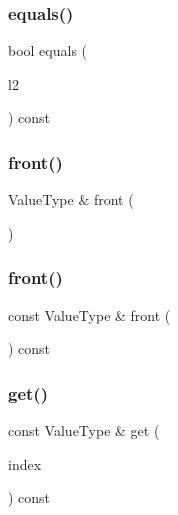 \subsubsection{\texorpdfstring{equals()}{equals()}}
{\footnotesize\ttfamily bool equals (\begin{DoxyParamCaption}\item[{const \mbox{\hyperlink{classLinkedList}{Linked\+List}}$<$ Value\+Type $>$ \&}]{l2 }\end{DoxyParamCaption}) const}

\mbox{\label{classLinkedList_a736a6bda35a26620407e175bee46ae4a}} 
\subsubsection{\texorpdfstring{front()}{front()}\hspace{0.1cm}{\footnotesize\ttfamily [1/2]}}
{\footnotesize\ttfamily Value\+Type \& front (\begin{DoxyParamCaption}{ }\end{DoxyParamCaption})}

\mbox{\label{classLinkedList_a02aaa52ad7a120201f6dd3e90eff737f}} 
\subsubsection{\texorpdfstring{front()}{front()}\hspace{0.1cm}{\footnotesize\ttfamily [2/2]}}
{\footnotesize\ttfamily const Value\+Type \& front (\begin{DoxyParamCaption}{ }\end{DoxyParamCaption}) const}

\mbox{\label{classLinkedList_adcb38df411d14f0bd9c14e23947d2e1c}} 
\subsubsection{\texorpdfstring{get()}{get()}}
{\footnotesize\ttfamily const Value\+Type \& get (\begin{DoxyParamCaption}\item[{int}]{index }\end{DoxyParamCaption}) const}

